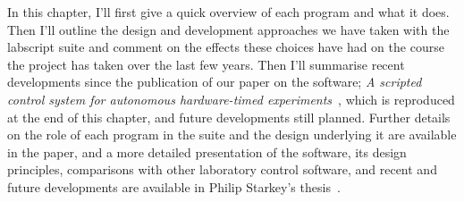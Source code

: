In this chapter, I'll first give a quick overview of each program and what it does. Then I'll outline the design and development approaches we have taken with the labscript suite and comment on the effects these choices have had on the course the project has taken over the last few years. Then I'll summarise recent developments since the publication of our paper on the software; \emph{A scripted control system for autonomous hardware-timed experiments}~\cite{starkey_scripted_2013}, which is reproduced at the end of this chapter, and future developments still planned. Further details on the role of each program in the suite and the design underlying it are available in the paper, and a more detailed presentation of the software, its design principles, comparisons with other laboratory control software, and recent and future developments are available in Philip Starkey's thesis~\cite{starkey_thesis_2018}.

